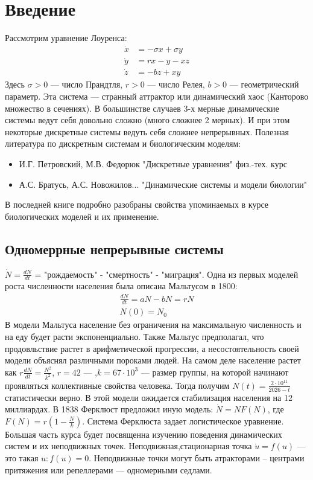 \section{Введение}
Рассмотрим уравнение Лоуренса:
\begin{equation}
	\begin{array}{ll}
		\dot{x} &= -\sigma x + \sigma y\\
		\dot{y} &= rx - y - xz\\
		\dot{z} &= -bz + xy
	\end{array}
\end{equation}
Здесь $\sigma > 0$ --- число Прандтля, $r > 0$ --- число Релея, $b > 0$ --- геометрический параметр.
Эта система --- странный аттрактор или динамический хаос (Канторово множество в сечениях).
В большинстве случаев 3-х мерные динамические системы ведут себя довольно сложно (много сложнее 2 мерных). И при этом некоторые дискретные системы ведуть себя сложнее непрерывных.
Полезная литература по дискретным системам и биологическим моделям:
\begin{itemize}
	\item И.Г. Петровский, М.В. Федорюк "Дискретные уравнения" физ.-тех. курс
	\item А.С. Братусь, А.С. Новожилов... "Динамические системы и модели биологии"
\end{itemize}
В последней книге подробно разобраны свойства упоминаемых в курсе биологических моделей и их применение.
\subsection{Одномеррные непрерывные системы}
$\dot{N} = \frac{dN}{dt}$ = "рождаемость" - "смертность" - "миграция". 
Одна из первых моделей роста численности населения была описана Мальтусом в 1800:
\begin{equation*}
	\begin{array}{ll}
		\frac{dN}{dt} = aN - bN = rN\\
		N(0) = N_0
	\end{array}
\end{equation*}
В модели Мальтуса население без ограничения на максимальную численность и на еду будет расти экспоненциально.
Также Мальтус предполагал, что продовльствие растет в арифметической прогрессии, а несостоятельность своей модели объяснял различными пороками людей.
На самом деле население растет как $r \frac{dN}{dt} = \frac{N^2}{k^2}$, $r=42$ --- ,$k = 67 \cdot 10^3$ --- размер группы, на которой начинают проявляться коллективные свойства человека. Тогда получим $N(t) = \frac{2 \cdot 10^11}{2026 - t}$ ~ статистически верно. В этой модели ожидается стабилизация населения на 12 миллиардах.
В 1838 Ферклюст предложил иную модель: $\dot{N} = NF(N)$, где $F(N) = r(1-\frac{N}{k})$. Система Ферклюста задает логистическое уравнение. 
Большая часть курса будет посвященна изучению поведения динамических систем и их неподвижных точек. Неподвижная,стационарная точка $\dot{u} = f(u)$ --- это такая $u: f(u) = 0$. Неподвижные точки могут быть атракторами -- центрами притяжения или репеллерами --- одномерными седлами.